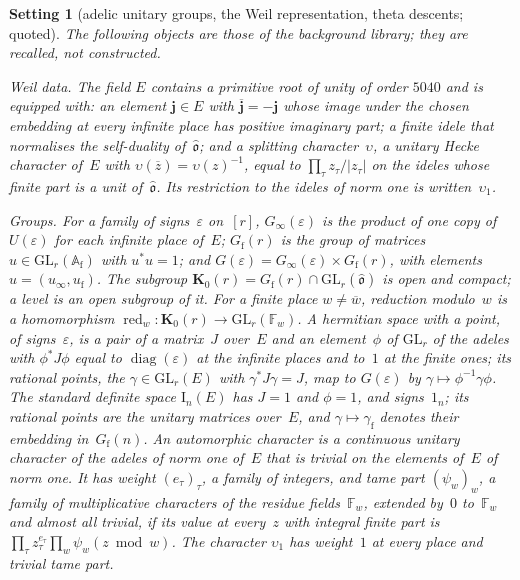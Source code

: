 \documentclass[11pt,a4paper]{article}
\newcommand{\m}[1]{\mbox{$#1$}}        %
\theoremstyle{plainx}
\theoremstyle{uprightx}
\newtheorem{setting}[theorem]{Setting}          %
\newcommand{\AAf}{\mathbb{A}_{\mathrm{f}}}
\newcommand{\FF}{\mathbb{F}}
\newcommand{\ohat}{\hat{\mathfrak{o}}}
\newcommand{\Ginf}[1]{G_{\infty}(#1)}
\newcommand{\Gfin}[1]{G_{\mathrm{f}}(#1)}
\newcommand{\Gad}[1]{G(#1)}
\newcommand{\Kz}[1]{\mathbf{K}_{0}(#1)}
\newcommand{\std}[2]{\mathrm{I}_{#2}(#1)}
\newcommand{\one}[1]{1_{#1}}
\newcommand{\red}[1]{\operatorname{red}_{#1}}
\newcommand{\conj}[1]{\overline{#1}}
\begin{document}
\begin{setting}[adelic unitary groups, the Weil representation, theta descents; quoted]\label{s:weil}
The following objects are those of the background library; they are recalled, not constructed.

\emph{Weil data.} The field $E$ contains a primitive root of unity of order $5040$ and is equipped with: an
element \m{\mathbf{j}\in E} with \m{\conj{\mathbf{j}}=-\mathbf{j}} whose image under the chosen embedding at every infinite
place has positive imaginary part; a finite idele that normalises the self-duality of~$\ohat$; and a
\emph{splitting character}~$\upsilon$, a unitary Hecke character of~$E$ with
\m{\upsilon(\conj{z})=\upsilon(z)^{-1}}, equal to \m{\prod_{\tau}z_{\tau}/|z_{\tau}|} on the ideles whose finite part
is a unit of~$\ohat$. Its restriction to the ideles of norm one is written~$\upsilon_{1}$.

\emph{Groups.} For a family of signs~$\varepsilon$ on~$[r]$, \m{\Ginf{\varepsilon}} is the product of one copy
of~$U(\varepsilon)$ for each infinite place of~$E$; \m{\Gfin{r}} is the group of matrices
\m{u\in\mathrm{GL}_{r}(\AAf)} with \m{u^{*}u=1}; and \m{\Gad{\varepsilon}=\Ginf{\varepsilon}\times\Gfin{r}}, with
elements \m{u=(u_{\infty},u_{\mathrm{f}})}. The subgroup \m{\Kz{r}=\Gfin{r}\cap\mathrm{GL}_{r}(\ohat)} is open and
compact; a \emph{level} is an open subgroup of it. For a finite place \m{w\ne\conj{w}}, reduction modulo~$w$ is a
homomorphism \m{\red{w}\colon\Kz{r}\to\mathrm{GL}_{r}(\FF_{w})}. A \emph{hermitian space with a point}, of
signs~$\varepsilon$, is a pair of a matrix~$J$ over~$E$ and an element~$\phi$ of \m{\mathrm{GL}_{r}} of the adeles
with \m{\phi^{*}J\phi} equal to \m{\operatorname{diag}(\varepsilon)} at the infinite places and to~$1$ at the finite ones;
its rational points, the \m{\gamma\in\mathrm{GL}_{r}(E)} with \m{\gamma^{*}J\gamma=J}, map to \m{\Gad{\varepsilon}} by
\m{\gamma\mapsto\phi^{-1}\gamma\phi}. The \emph{standard definite space} \m{\std{E}{n}} has \m{J=1} and \m{\phi=1}, and
signs~\m{\one{n}}; its rational points are the unitary matrices over~$E$, and \m{\gamma\mapsto\gamma_{\mathrm{f}}}
denotes their embedding in~\m{\Gfin{n}}. An \emph{automorphic character} is a continuous unitary character of the
adeles of norm one of~$E$ that is trivial on the elements of~$E$ of norm one. It has \emph{weight}
\m{(e_{\tau})_{\tau}}, a family of integers, and \emph{tame part} \m{(\psi_{w})_{w}}, a family of multiplicative
characters of the residue fields~$\FF_{w}$, extended by~$0$ to~$\FF_{w}$ and almost all trivial, if its value at
every~$z$ with integral finite part is \m{\prod_{\tau}z_{\tau}^{e_{\tau}}\prod_{w}\psi_{w}(z\bmod w)}. The
character \m{\upsilon_{1}} has weight~$1$ at every place and trivial tame part.


\end{setting}
\end{document}
